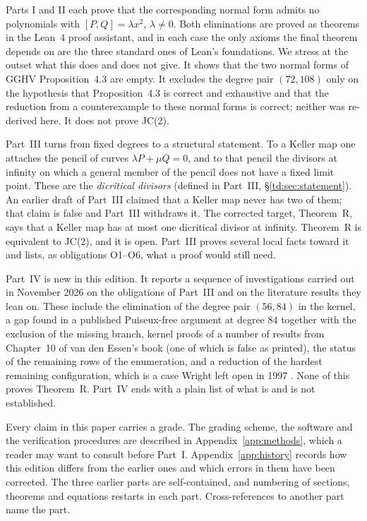 \documentclass[a4paper,11pt]{article}
\theoremstyle{jsplain}
\theoremstyle{jsdef}
\theoremstyle{jsrem}
\begin{document}
Parts I and II each prove that the corresponding normal form admits no polynomials with $[P,Q]=\lambda x^2$, $\lambda\ne0$. Both eliminations are proved as theorems in the Lean~4 proof assistant, and in each case the only axioms the final theorem depends on are the three standard ones of Lean's foundations. We stress at the outset what this does and does not give. It shows that the two normal forms of GGHV Proposition~4.3 are empty. It excludes the degree pair $(72,108)$ only on the hypothesis that Proposition~4.3 is correct and exhaustive and that the reduction from a counterexample to these normal forms is correct; neither was re-derived here. It does not prove JC(2).

Part~III turns from fixed degrees to a structural statement. To a Keller map one attaches the pencil of curves $\lambda P+\mu Q=0$, and to that pencil the divisors at infinity on which a general member of the pencil does not have a fixed limit point. These are the \emph{dicritical divisors} (defined in Part~III, \S\ref{td:sec:statement}). An earlier draft of Part~III claimed that a Keller map never has two of them; that claim is false and Part~III withdraws it. The corrected target, Theorem~R, says that a Keller map has at most one dicritical divisor at infinity. Theorem~R is equivalent to JC(2), and it is open. Part~III proves several local facts toward it and lists, as obligations O1--O6, what a proof would still need.

Part~IV is new in this edition. It reports a sequence of investigations carried out in November 2026 on the obligations of Part~III and on the literature results they lean on. These include the elimination of the degree pair $(56,84)$ in the kernel, a gap found in a published Puiseux-free argument at degree $84$ together with the exclusion of the missing branch, kernel proofs of a number of results from Chapter~10 of van den Essen's book \cite{vdE2000} (one of which is false as printed), the status of the remaining rows of the enumeration, and a reduction of the hardest remaining configuration, which is a case Wright left open in 1997 \cite{Wright1997}. None of this proves Theorem~R. Part~IV ends with a plain list of what is and is not established.

Every claim in this paper carries a grade. The grading scheme, the software and the verification procedures are described in Appendix~\ref{app:methods}, which a reader may want to consult before Part~I. Appendix~\ref{app:history} records how this edition differs from the earlier ones and which errors in them have been corrected. The three earlier parts are self-contained, and numbering of sections, theorems and equations restarts in each part. Cross-references to another part name the part.
\end{document}
